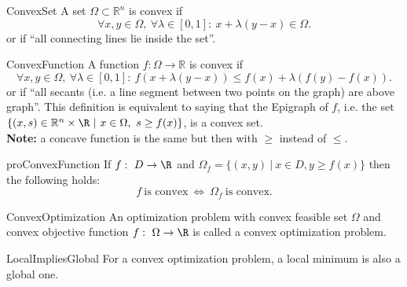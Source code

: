 \begin{theo}{ConvexSet}
    A set $\Omega \subset \mathbb{R}^n$ is convex if 
    \begin{equation*}
        \forall x,y \in \Omega, \ \forall \lambda \in [0,1]: \ x + \lambda(y - x) \in \Omega.
    \end{equation*}
    or if ``all connecting lines lie inside the set''.
\end{theo}

\begin{theo}{ConvexFunction}
    A function $f: \Omega \rightarrow \mathbb{R}$ is convex if 
    \begin{equation*}
        \forall x,y \in \Omega, \ \forall \lambda \in [0,1]: \ f(x + \lambda(y - x)) \leq f(x) + \lambda(f(y) - f(x)).
    \end{equation*}
    or if ``all secants (i\@.e\@. a line segment between two points on the graph) are above graph''. This definition is equivalent to saying that the Epigraph of $f$, i\@.e\@. the set $\{(x,s) \in \mathbb{R}^n \times \R \ | \ x \in \Omega, \ s \geq f(x) \}$, is a convex set. \\

    \textbf{Note:} a concave function is the same but then with $\geq$ instead of $\leq$.
\end{theo}

\begin{pro}{proConvexFunction}
    If $f: \ D \rightarrow \R$ and $\Omega_f = \{ (x,y) \ | \ x \in D, y \geq f(x)\}$ then the following holds:
    \begin{equation*}
        f \ \text{is convex} \ \Leftrightarrow \ \Omega_f \ \text{is convex}.
    \end{equation*}
    \vspace*{-0.5cm}
\end{pro}

\begin{theo}{ConvexOptimization}
    An optimization problem with convex feasible set $\Omega$ and convex objective function $f: \ \Omega \rightarrow \R$ is called a convex optimization problem. 
\end{theo}

\begin{pro}{LocalImpliesGlobal}
    For a convex optimization problem, a local minimum is also a global one.
\end{pro}

